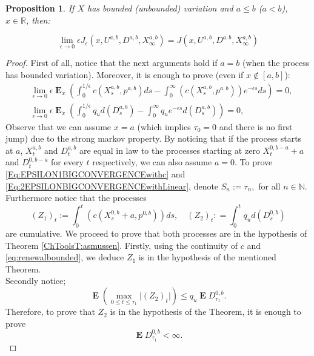 \documentclass{article}
\newtheorem{proposition}[thm]{Proposition}
\newcommand\E{\operatorname{\mathbf{E}}}
\begin{document}
\begin{proposition}\label{P:convergenceepsilon}
If $X$ has bounded (unbounded) variation and $a \leq b$ ($a <b$), $x \in \mathbb{R}$, then:

$$\lim_{\epsilon \to 0}\epsilon J_{\epsilon}(x,U^{a,b},D^{a,b},X_{\infty}^{a,b})=J(x,U^{a,b},D^{a,b},X^{a,b}_{\infty}) $$
\end{proposition}
\begin{proof}
First of all, notice that the next arguments hold if $a=b$ (when the process has bounded variation). Moreover, it is enough to prove (even if $x\notin [a,b]$):
\begin{align}\label{Eq:EPSILON1BIGCONVERGENCEwithc}
&\lim_{\epsilon \to 0}\epsilon \E_x \left( \int_0^{1/{\epsilon}}c(X^{a,b}_s,p^{a,b}) ds  - \int_0^{\infty}\left(c(X^{a,b}_s,p^{a,b}) \right)e^{-\epsilon s}ds\right)=0,
\\
 \label{Eq:2EPSILONBIGCONVERGENCEwithLinear}
&\lim_{\epsilon \to 0}\epsilon \E_x \left(\int_{0}^{1/\epsilon}q_u  d(D^{a,b}_s)  -\int_{0}^{\infty}q_ue^{-\epsilon s} d(D^{a,b}_s) \right)=0, 
\end{align}
%
Observe that we can assume $x=a$  (which implies $\tau_0=0$ and there is no first jump) due to the strong markov property. By noticing that if the process starts at $a$, $X^{a,b}_t$ and $D^{a,b}_t$ are equal in law to the processes starting at zero $X^{0,b-a}_t+a$ and $D^{0,b-a}_t$ for every $t$ respectively, we can also assume $a=0$.
To prove \eqref{Eq:EPSILON1BIGCONVERGENCEwithc} and \eqref{Eq:2EPSILONBIGCONVERGENCEwithLinear}, denote $S_n:= \tau_n,$  for all $n \in \mathbb{N}$.  Furthermore notice that the processes
%
\begin{equation*}
(Z_1)_t := \int_0^{t}\left(c(X^{0,b}_s+a,p^{0,b}) \right)ds , \quad (Z_2)_t : =\int_{0}^{t}q_u d(D^{0,b}_s)  
\end{equation*}
are cumulative. We proceed to prove that both processes are in the hypothesis of Theorem \ref{ChToolsT:asmussen}. Firstly, using the continuity of $c$ and \eqref{eq:renewalbounded}, we deduce $Z_1$ is in the hypothesis of the mentioned Theorem.\\
Secondly notice;
\begin{equation*}
\E \left(\max_{0 \leq t \leq \tau_1} \vert (Z_2)_t \vert \right)\leq q_u\E D^{0,b}_{\tau_1} .
\end{equation*}
Therefore, to prove that $Z_2$ is in the hypothesis of the Theorem, it is enough to prove 
\begin{equation*}
\E D^{0,b}_{\tau_1}< \infty.

\end{equation*}
\end{proof}
\end{document}
